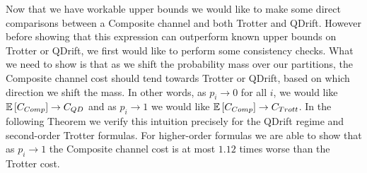 Now that we have workable upper bounds we would like to make some direct comparisons between a Composite channel and both Trotter and QDrift. However before showing that this expression can outperform known upper bounds on Trotter or QDrift, we first would like to perform some consistency checks. What we need to show is that as we shift the probability mass over our partitions, the Composite channel cost should tend towards Trotter or QDrift, based on which direction we shift the mass. In other words, as $p_i \to 0$ for all $i$, we would like $\mathbb{E}\left[ C_{Comp} \right] \to C_{QD}$ and as $p_i \to 1$ we would like $\mathbb{E}\left[ C_{Comp} \right] \to  C_{Trott}$. In the following Theorem we verify this intuition precisely for the QDrift regime and second-order Trotter formulas. For higher-order formulas we are able to show that as $p_i \to 1$ the Composite channel cost is at most $1.12$ times worse than the Trotter cost.
 
